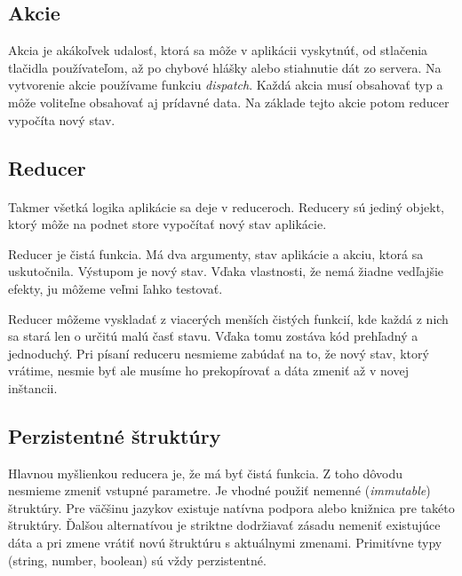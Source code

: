 \subsection{Akcie}
Akcia je akákoľvek udalosť, ktorá sa môže v aplikácii vyskytnúť, od stlačenia tlačidla používateľom, až po chybové hlášky alebo stiahnutie dát zo servera. Na vytvorenie akcie používame funkciu \emph{dispatch}. Každá akcia musí obsahovať typ a môže voliteľne obsahovať aj prídavné data. Na základe tejto akcie potom reducer vypočíta nový stav.

\subsection{Reducer}
\emph{} \cite{reduxReducer}

\paragraph{}
Takmer všetká logika aplikácie sa deje v reduceroch. Reducery sú jediný objekt, ktorý môže na podnet store vypočítať nový stav aplikácie.

Reducer je čistá funkcia. Má dva argumenty, stav aplikácie a akciu, ktorá sa uskutočnila. Výstupom je nový stav. Vďaka vlastnosti, že nemá žiadne vedľajšie efekty, ju môžeme veľmi ľahko testovať.

Reducer môžeme vyskladať z viacerých menších čistých funkcií, kde každá z nich sa stará len o určitú malú časť stavu. Vďaka tomu zostáva kód prehľadný a jednoduchý. 
Pri písaní reduceru nesmieme zabúdať na to, že nový stav, ktorý vrátime, nesmie byť  ale musíme ho prekopírovať a dáta zmeniť až v novej inštancii.

\subsection{Perzistentné štruktúry}
Hlavnou myšlienkou reducera je, že má byť čistá funkcia. Z toho dôvodu nesmieme zmeniť vstupné parametre. Je vhodné použiť nemenné (\emph{immutable}) štruktúry. Pre väčšinu jazykov existuje natívna podpora alebo knižnica pre takéto štruktúry. Ďalšou alternatívou je striktne dodržiavať zásadu nemeniť existujúce dáta a pri zmene vrátiť novú štruktúru s aktuálnymi zmenami. Primitívne typy (string, number, boolean) sú vždy perzistentné.

